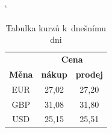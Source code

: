 \documentclass[a4paper, 11pt]{article}
\begin{document}
\begin{table}[h]
	\catcode`
	\begin{center}
	\begin{tabular}{|c|c|c|}
		\hline & \multicolumn{2}{c|}{\bfseries Cena} \\
			\cline{2-3}
		\bfseries Měna & \bfseries nákup & \bfseries prodej \\
		\hline EUR & 27,02 & 27,20 \\
		GBP & 31,08 & 31,80 \\
		USD & 25,15 & 25,51 \\ \hline
	\end{tabular}
		\caption{Tabulka kurzů k~dnešnímu dni}
		\label{tabulka1}
	\end{center}
\end{table}
\end{document}
